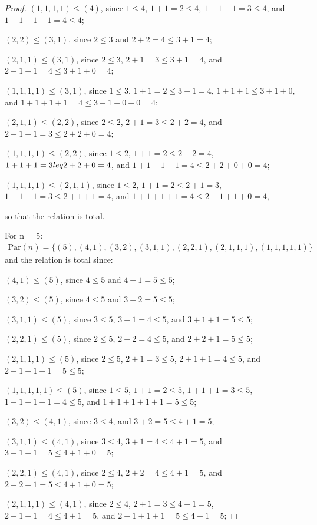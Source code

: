 \documentclass[12pt]{extarticle}
\newcommand{\set}[1]{\{#1\}}
\newcommand{\<}{\langle}
\renewcommand{\>}{\rangle}
\theoremstyle{definition}
\begin{document}
\begin{proof}
  $(1,1,1,1) \leq (4)$, since $1 \leq 4$, $1+1=2 \leq 4$, $1+1+1=3 \leq 4$, and $1+1+1+1 = 4\leq 4$;

  $(2,2) \leq (3,1)$, since $ 2 \leq 3$ and $2+2=4 \leq 3+1=4 $;

  $(2,1,1) \leq (3,1)$, since $2 \leq 3$, $2+1=3 \leq 3+1 = 4$, and $2+1+1 = 4 \leq 3+1+0 = 4$;

  $(1,1,1,1) \leq (3,1)$, since $1 \leq 3$, $1+1=2 \leq 3+1=4$, $1+1+1 \leq 3+1+0$, and $1+1+1+1 = 4 \leq 3+1+0+0 = 4$;

  $(2,1,1) \leq (2,2)$, since $ 2 \leq 2$, $2+1 = 3 \leq 2+2 = 4$, and $2+1+1 = 3 \leq 2+2+0=4$;

  $(1,1,1,1) \leq (2,2)$, since $1 \leq 2$, $1+1 = 2 \leq 2+2=4$, $1+1+1 = 3 \\leq 2+2+0 = 4$, and $1+1+1+1 = 4 \leq 2+2+0+0=4$;

  $(1,1,1,1) \leq (2,1,1)$, since $1 \leq 2$, $1+1=2 \leq 2+1=3$, $1+1+1=3 \leq 2+1+1=4$, and $1+1+1+1=4 \leq 2+1+1+0 = 4$,

  so that the relation is total.

  For n = 5:
  \begin{align*}
    \text{Par}(n) = \set{(5), (4,1), (3,2), (3,1,1), (2,2,1), (2,1,1,1), (1,1,1,1,1)}
  \end{align*}
  and the relation is total since:

  $(4,1) \leq (5)$, since $ 4 \leq 5$ and $4 + 1 = 5 \leq 5 $;

  $(3,2) \leq (5)$, since $4 \leq 5$ and $3+2=5 \leq 5$;

  $(3,1,1) \leq (5)$, since $3 \leq 5$, $3+1=4 \leq 5$, and $3+1+1=5 \leq 5$;

  $(2,2,1) \leq (5)$, since $2 \leq 5$, $2+2=4 \leq 5$, and $2+2+1 = 5 \leq 5$;

  $(2,1,1,1) \leq (5)$, since $2 \leq 5$, $2+1=3 \leq 5$, $2+1+1=4 \leq 5$, and $2+1+1+1 = 5 \leq 5$;

  $(1,1,1,1,1) \leq (5)$, since $1 \leq 5$, $1+1=2 \leq 5$, $1+1+1 = 3 \leq 5$, $1+1+1+1 = 4 \leq 5$, and $1+1+1+1+1 = 5 \leq 5$;

  $(3,2) \leq (4,1)$, since $ 3 \leq 4$, and $3 + 2 = 5 \leq 4+1 = 5$;

  $(3,1,1) \leq (4,1)$, since $ 3 \leq 4$, $3 + 1 = 4 \leq 4 + 1 = 5$, and $3+1+1 = 5 \leq 4+1+0=5$;

  $(2,2,1) \leq (4,1)$, since $ 2 \leq 4$, $2+2=4 \leq 4+1=5$, and $2+2+1 = 5 \leq 4+1+0 = 5$;

  $(2,1,1,1) \leq (4,1)$, since $ 2 \leq 4$, $2+1=3 \leq 4+1=5$, $2+1+1=4 \leq 4+1 = 5$, and $2+1+1+1 = 5 \leq 4+1 = 5$;


\end{proof}
\end{document}
